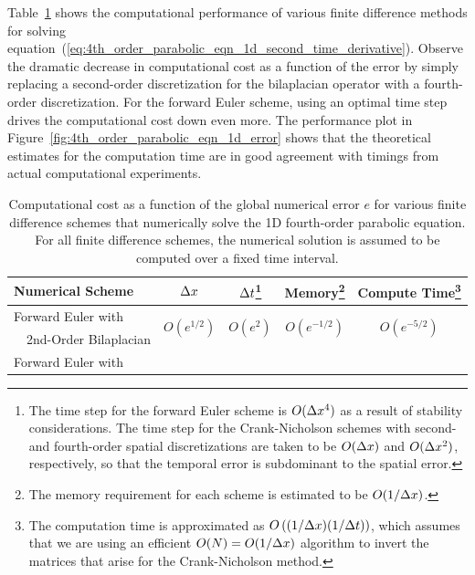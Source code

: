 \documentclass[oneeqnum,onefignum,onetabnum,onethmnum]{siamltex}
\begin{document}
Table~\ref{tab:comp_perf_vs_err_4th_order_parabolic} shows the computational 
performance of various finite difference methods for solving 
equation~(\ref{eq:4th_order_parabolic_eqn_1d_second_time_derivative}).
Observe the dramatic decrease in computational cost as a function of the
error by simply replacing a second-order discretization for the bilaplacian 
operator with a fourth-order discretization.  For the forward Euler scheme,
using an optimal time step drives the computational cost down even more.
The performance plot in Figure~\ref{fig:4th_order_parabolic_eqn_1d_error} 
shows that the theoretical estimates for the computation time are in good 
agreement with timings from actual computational experiments.

\begin{table}[tb]
\caption{\label{tab:comp_perf_vs_err_4th_order_parabolic} 
   Computational cost as a function of the global numerical error $e$
   for various finite difference schemes that numerically solve the 1D 
   fourth-order parabolic equation.  For all finite difference schemes, the 
   numerical solution is assumed to be computed over a fixed time interval.
}
\begin{minipage}{\textwidth}
\begin{center} \footnotesize
\renewcommand{\arraystretch}{1.3}
\begin{tabular}{|l|c|c|c|c|}
  \hline
  {\bf Numerical Scheme} & $\Delta x$ 
  & $\Delta t$\footnote{The time step for the forward Euler scheme is $O(\Delta x^4)$
   as a result of stability considerations.  The time step for the 
   Crank-Nicholson schemes with second- and fourth-order spatial 
   discretizations are taken to be $O(\Delta x)$ and $O(\Delta x^2)$, respectively, so 
   that the temporal error is subdominant to the spatial error.}
  & {\bf Memory}\footnote{The memory requirement for each scheme is estimated 
    to be $O(1/\Delta x)$.} 
  & {\bf Compute Time}\footnote{The computation time is approximated as 
    $O\left( (1/\Delta x) (1/\Delta t) \right)$, which assumes that we are using an 
    efficient $O(N) = O(1/\Delta x)$ algorithm to invert the matrices that 
    arise for the Crank-Nicholson method.}  \\
  \hline 
  Forward Euler with 
    & \multirow{2}{*}{$O\left( e^{1/2} \right)$} 
    & \multirow{2}{*}{$O\left( e^{2} \right)$}
    & \multirow{2}{*}{$O\left( e^{-1/2} \right)$} 
    & \multirow{2}{*}{$O\left( e^{-5/2} \right)$} \\
  \ \ 2nd-Order Bilaplacian & & & & \\
  \hline 
  Forward Euler with 

\end{tabular}
\end{center}
\end{minipage}
\end{table}
\end{document}
